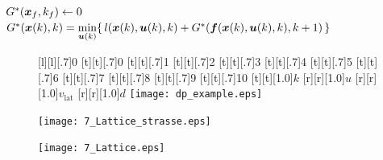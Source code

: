 
\begin{algorithm}[h]
 \begin{algorithmic}[1]
	\STATE $G^\ast(\boldsymbol{x}_f,k_f) \leftarrow 0$
			\STATE $G^\ast(\boldsymbol{x}(k),k) = \underset{\boldsymbol{u}(k)}{\min}\{\,l(\boldsymbol{x}(k), \boldsymbol{u}(k), k) + G^\ast(\boldsymbol{f}(\boldsymbol{x}(k), \boldsymbol{u}(k), k),k+1)\,\}$
		\ENDFOR
	\ENDFOR
 \end{algorithmic}
 \label{alg:valueiteration}
 \end{algorithm}

\begin{figure}[h]
	[l][.7]{0}
	[t][.7]{0}
	[t][.7]{1}
	[t][.7]{2}
	[t][.7]{3}
	[t][.7]{4}
	[t][.7]{5}
	[t][.7]{6}
	[t][.7]{7}
	[t][.7]{8}
	[t][.7]{9}
	[t][.7]{10}
	[t][1.0]{$k$}
	[r][1.0]{$u$}
	[r][1.0]{$v_\text{lat}$}
	[r][1.0]{$d$}
	\centering
	\centering
  	\texttt{[image: dp\_example.eps]}
	\label{fig:dynamische_programmierung_veranschaulichung}
\end{figure} 




\begin{figure}[h]
\centering
  	\texttt{[image: 7\_Lattice\_strasse.eps]}
	\label{fig:lattice_strasse}
\end{figure}

\begin{figure}[h]
\centering
  	\texttt{[image: 7\_Lattice.eps]}
	\label{fig:lattice}
\end{figure}

